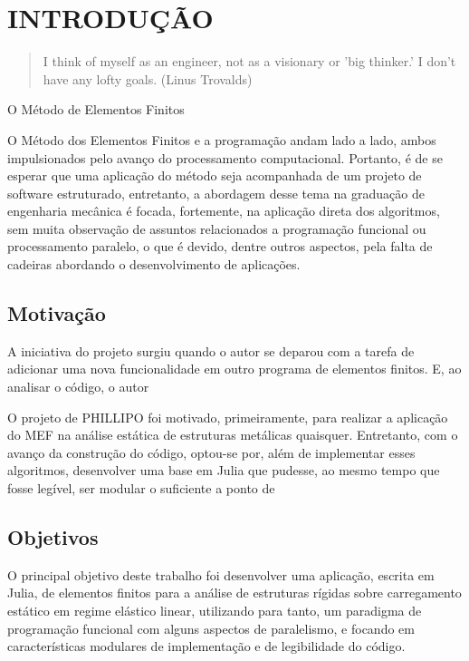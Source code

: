 

\chapter{INTRODUÇÃO}

\begin{quote}
    I think of myself as an engineer, not as a visionary or 'big thinker.' I don't have any lofty goals.
    (Linus Trovalds)  
\end{quote}

O Método de Elementos Finitos 

O Método dos Elementos Finitos e a programação andam lado a lado, ambos impulsionados pelo avanço do processamento computacional. Portanto, é de se esperar que uma aplicação do método seja acompanhada de um projeto de software estruturado, entretanto, a abordagem desse tema na graduação de engenharia mecânica é focada, fortemente, na aplicação direta dos algoritmos, sem muita observação de assuntos relacionados a programação funcional ou processamento paralelo, o que é devido, dentre outros aspectos, pela falta de cadeiras abordando o desenvolvimento de aplicações. 

\section{Motivação}

A iniciativa do projeto surgiu quando o autor se deparou com a tarefa de adicionar uma nova funcionalidade em outro programa de elementos finitos. E, ao analisar o código, o autor 

O projeto de PHILLIPO foi motivado, primeiramente, para realizar a aplicação do MEF na análise estática de estruturas metálicas quaisquer. Entretanto, com o avanço da construção do código, optou-se por, além de implementar esses algoritmos, desenvolver uma base em Julia que pudesse, ao mesmo tempo que fosse legível, ser modular o suficiente a ponto de 

\section{Objetivos}

O principal objetivo deste trabalho foi desenvolver uma aplicação, escrita em Julia, de elementos finitos para a análise de estruturas rígidas sobre carregamento estático em regime elástico linear, utilizando para tanto, um paradigma de programação funcional com alguns aspectos de paralelismo, e focando em características modulares de implementação e de legibilidade do código.

